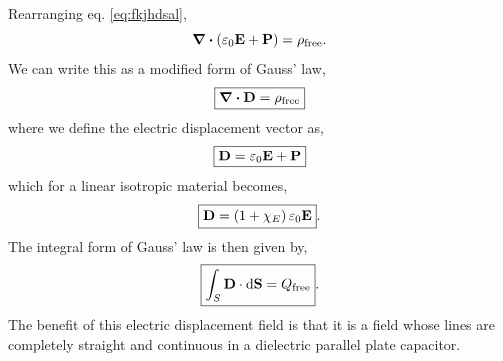 \documentclass{book}
\begin{document}
Rearranging eq. \eqref{eq:fkjhdsal},
\begin{equation}
	\div{\left(\varepsilon_0\vb{E} + \vb{P}\right)} = \rho_{\text{free}}.
\end{equation}
We can write this as a modified form of Gauss' law,
\begin{equation}
	\boxed{\div{\vb{D}} = \rho_{\text{free}}}
\end{equation}
where we define the electric displacement vector as,
\begin{equation}
	\boxed{\vb{D} = \varepsilon_0\vb{E} + \vb{P}}
\end{equation}
which for a linear isotropic material becomes,
\begin{equation}
	\boxed{\vb{D} = \left(1 + \chi_E\right)\varepsilon_0\vb{E}}.
\end{equation}
The integral form of Gauss' law is then given by,
\begin{equation}
	\boxed{\int_S\vb{D}\cdot\dd{\vb{S}} = Q_{\text{free}}}. \label{eq:d field}
\end{equation}
The benefit of this electric displacement field is that it is a field whose lines are completely straight and continuous in a dielectric parallel plate capacitor.
\end{document}
